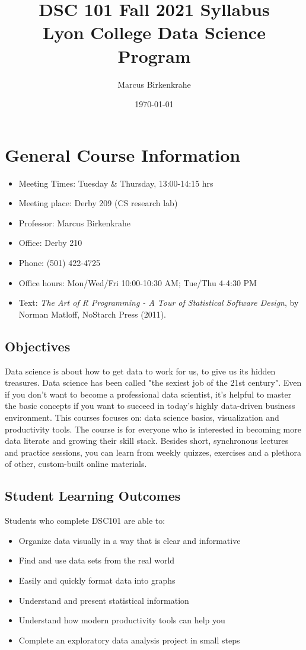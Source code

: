 \documentclass[11pt]{article}
\author{Marcus Birkenkrahe}
\date{\today}
\title{DSC 101 Fall 2021 Syllabus\\\medskip
\large Lyon College Data Science Program}
\begin{document}
\maketitle
\section{General Course Information}
\label{sec:org0e9c926}

\begin{itemize}
\item Meeting Times: Tuesday \& Thursday, 13:00-14:15 hrs
\item Meeting place: Derby 209 (CS research lab)
\item Professor: Marcus Birkenkrahe
\item Office: Derby 210
\item Phone: (501) 422-4725
\item Office hours: Mon/Wed/Fri 10:00-10:30 AM; Tue/Thu 4-4:30 PM
\item Text: \emph{The Art of R Programming - A Tour of Statistical Software
Design}, by Norman Matloff, NoStarch Press (2011).
\end{itemize}

\subsection{Objectives}
\label{sec:orgf2df249}

Data science is about how to get data to work for us, to give us its
hidden treasures. Data science has been called "the sexiest job of
the 21st century". Even if you don't want to become a professional
data scientist, it’s helpful to master the basic concepts if you
want to succeed in today's highly data-driven business
environment. This courses focuses on: data science basics,
visualization and productivity tools. The course is for everyone who
is interested in becoming more data literate and growing their skill
stack. Besides short, synchronous lectures and practice sessions,
you can learn from weekly quizzes, exercises and a plethora of
other, custom-built online materials.

\subsection{Student Learning Outcomes}
\label{sec:orgebd37ce}

Students who complete DSC101 are able to:

\begin{itemize}
\item Organize data visually in a way that is clear and informative
\item Find and use data sets from the real world
\item Easily and quickly format data into graphs
\item Understand and present statistical information
\item Understand how modern productivity tools can help you
\item Complete an exploratory data analysis project in small steps
\end{itemize}
\end{document}
